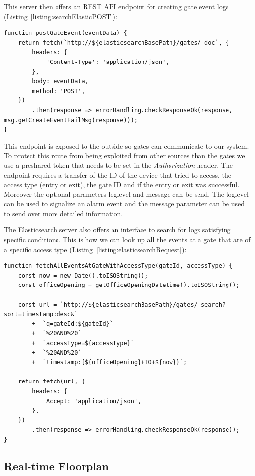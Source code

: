 This server then offers an REST API endpoint for creating gate event logs (Listing~\ref{listing:searchElasticPOST}):
\begin{lstlisting}[label={listing:searchElasticPOST},caption={Interface of Elasticsearch server to create gate event logs}]
function postGateEvent(eventData) {
    return fetch(`http://${elasticsearchBasePath}/gates/_doc`, {
        headers: {
            'Content-Type': 'application/json',
        },
        body: eventData,
        method: 'POST',
    })
        .then(response => errorHandling.checkResponseOk(response, msg.getCreateEventFailMsg(response)));
}
\end{lstlisting}

This endpoint is exposed to the outside so gates can communicate to our system. To protect this route from being exploited from other sources than the gates we use a preshared token that needs to be set in the \emph{Authorization} header.
 The endpoint requires a transfer of the ID of the device that tried to access, the access type (entry or exit), the gate ID and if the entry or exit was successful. Moreover the optional parameters loglevel and message can be send. The loglevel can be used to signalize an alarm event and the message parameter can be used to send over more detailed information.

The Elasticsearch server also offers an interface to search for logs satisfying specific conditions. This is how we can look up all the events at a gate that are of a specific access type (Listing~\ref{listing:elasticsearchRequest}):

\begin{lstlisting}[label={listing:elasticsearchRequest},caption={Example search request to Elasticsearch server}]
function fetchAllEventsAtGateWithAccessType(gateId, accessType) {
    const now = new Date().toISOString();
    const officeOpening = getOfficeOpeningDatetime().toISOString();

    const url = `http://${elasticsearchBasePath}/gates/_search?sort=timestamp:desc&`
        +  `q=gateId:${gateId}`
        +  `%20AND%20`
        +  `accessType=${accessType}`
        +  `%20AND%20`
        +  `timestamp:[${officeOpening}+TO+${now}}`;
        
    return fetch(url, {
        headers: {
            Accept: 'application/json',
        },
    })
        .then(response => errorHandling.checkResponseOk(response));
}
\end{lstlisting}

\subsection{Real-time Floorplan}
\label{Real-time Floorplan}

